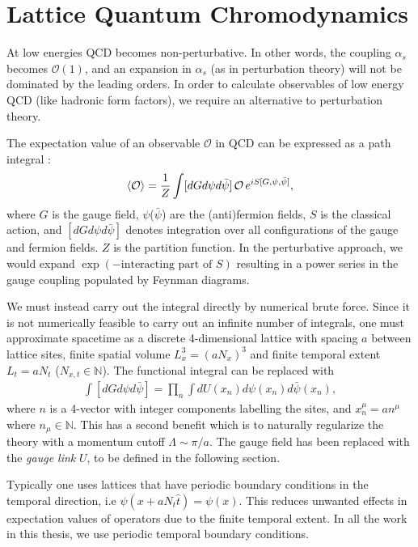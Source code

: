 ﻿\chapter{Lattice Quantum Chromodynamics}
\label{chap:latticeqcd}

At low energies QCD becomes non-perturbative. In other words, the coupling $\alpha_s$ becomes $\mathcal{O}(1)$, and an expansion in $\alpha_s$ (as in perturbation theory) will not be dominated by the leading orders. In order to calculate observables of low energy QCD (like hadronic form factors), we require an alternative to perturbation theory.

The expectation value of an observable $\mathcal{O}$ in QCD can be expressed as a path integral \cite{Peskin:1995ev}:
\begin{align}
  \langle \mathcal{O} \rangle = {1\over Z}\int [dG d\psi d\bar{\psi}] \, \mathcal{O} \, e^{iS[G,\psi,\bar{\psi}]},
\end{align}
where $G$ is the gauge field, $\psi$($\bar{\psi}$) are the (anti)fermion fields, $S$ is the classical action, and $[dG d\psi d\bar{\psi}]$ denotes integration over all configurations of the gauge and fermion fields. $Z$ is the partition function. In the perturbative approach, we would expand $\exp(-\text{interacting part of }S )$ resulting in a power series in the gauge coupling populated by Feynman diagrams.

We must instead carry out the integral directly by numerical brute force. Since it is not numerically feasible to carry out an infinite number of integrals, one must approximate spacetime as a discrete 4-dimensional lattice with spacing $a$ between lattice sites, finite spatial volume $L_x^3=(aN_x)^3$ and finite temporal extent $L_t=aN_t$ ($N_{x,t}\in \mathbb{N}$). The functional integral can be replaced with \cite{DeGrand:2006zz}
\begin{align}
  \int [dG d\psi d\bar{\psi}] = \prod_{n} \int dU(x_n) d\psi(x_n) d\bar{\psi}(x_n),
\end{align}
where $n$ is a 4-vector with integer components labelling the sites, and $x_n^{\mu} = an^{\mu}$ where $n_{\mu}\in \mathbb{N}$.
This has a second benefit which is to naturally regularize the theory with a momentum cutoff $\Lambda \sim \pi/a$. The gauge field has been replaced with the {\it{gauge link}} $U$, to be defined in the following section.

Typically one uses lattices that have periodic boundary conditions in the temporal direction, i.e $\psi(x+aN_t \hat{t}) = \psi(x)$. This reduces unwanted effects in expectation values of operators due to the finite temporal extent. In all the work in this thesis, we use periodic temporal boundary conditions.

